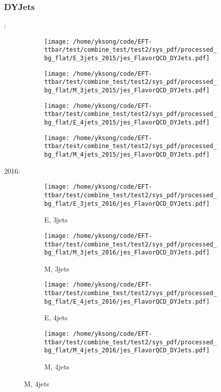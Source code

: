 \documentclass{beamer}
\begin{document}
\begin{frame}
\frametitle{DYJets}
\fontsize{5}{1}:
\begin{figure}
\centering
\begin{subfigure}[b]{0.24\textwidth}
\texttt{[image: /home/yksong/code/EFT-ttbar/test/combine\_test/test2/sys\_pdf/processed\_bg\_flat/E\_3jets\_2015/jes\_FlavorQCD\_DYJets.pdf]}
\end{subfigure}
\begin{subfigure}[b]{0.24\textwidth}
\texttt{[image: /home/yksong/code/EFT-ttbar/test/combine\_test/test2/sys\_pdf/processed\_bg\_flat/M\_3jets\_2015/jes\_FlavorQCD\_DYJets.pdf]}
\end{subfigure}
\begin{subfigure}[b]{0.24\textwidth}
\texttt{[image: /home/yksong/code/EFT-ttbar/test/combine\_test/test2/sys\_pdf/processed\_bg\_flat/E\_4jets\_2015/jes\_FlavorQCD\_DYJets.pdf]}
\end{subfigure}
\begin{subfigure}[b]{0.24\textwidth}
\texttt{[image: /home/yksong/code/EFT-ttbar/test/combine\_test/test2/sys\_pdf/processed\_bg\_flat/M\_4jets\_2015/jes\_FlavorQCD\_DYJets.pdf]}
\end{subfigure}
\end{figure}
2016:
\begin{figure}
\centering
\begin{subfigure}[b]{0.24\textwidth}
\texttt{[image: /home/yksong/code/EFT-ttbar/test/combine\_test/test2/sys\_pdf/processed\_bg\_flat/E\_3jets\_2016/jes\_FlavorQCD\_DYJets.pdf]}
\captionsetup{font=tiny}
\caption{E, 3jets}
\end{subfigure}
\begin{subfigure}[b]{0.24\textwidth}
\texttt{[image: /home/yksong/code/EFT-ttbar/test/combine\_test/test2/sys\_pdf/processed\_bg\_flat/M\_3jets\_2016/jes\_FlavorQCD\_DYJets.pdf]}
\captionsetup{font=tiny}
\caption{M, 3jets}
\end{subfigure}
\begin{subfigure}[b]{0.24\textwidth}
\texttt{[image: /home/yksong/code/EFT-ttbar/test/combine\_test/test2/sys\_pdf/processed\_bg\_flat/E\_4jets\_2016/jes\_FlavorQCD\_DYJets.pdf]}
\captionsetup{font=tiny}
\caption{E, 4jets}
\end{subfigure}
\begin{subfigure}[b]{0.24\textwidth}
\texttt{[image: /home/yksong/code/EFT-ttbar/test/combine\_test/test2/sys\_pdf/processed\_bg\_flat/M\_4jets\_2016/jes\_FlavorQCD\_DYJets.pdf]}
\captionsetup{font=tiny}
\caption{M, 4jets}
\end{subfigure}
\end{figure}
\end{frame}
\end{document}
